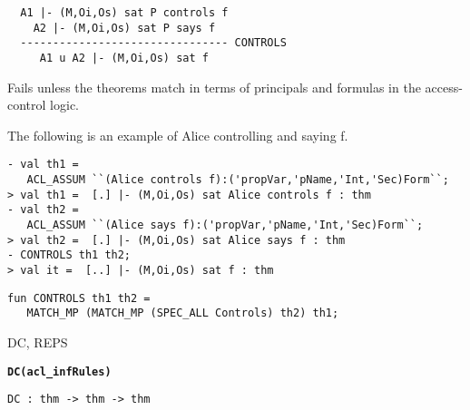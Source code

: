 \DESCRIBE
\begin{verbatim}
  A1 |- (M,Oi,Os) sat P controls f   
    A2 |- (M,Oi,Os) sat P says f
  -------------------------------- CONTROLS
     A1 u A2 |- (M,Oi,Os) sat f
\end{verbatim}

\FAILURE
Fails unless the theorems match in terms of principals and formulas
in the access-control logic.

\EXAMPLE
The following is an example of Alice controlling and saying f.
\begin{holboxed}
\begin{verbatim}
- val th1 = 
   ACL_ASSUM ``(Alice controls f):('propVar,'pName,'Int,'Sec)Form``;
> val th1 =  [.] |- (M,Oi,Os) sat Alice controls f : thm
- val th2 = 
   ACL_ASSUM ``(Alice says f):('propVar,'pName,'Int,'Sec)Form``;
> val th2 =  [.] |- (M,Oi,Os) sat Alice says f : thm
- CONTROLS th1 th2;
> val it =  [..] |- (M,Oi,Os) sat f : thm
\end{verbatim}
\end{holboxed}

\IMPLEMENTATION
\begin{holboxed}
\begin{verbatim}
fun CONTROLS th1 th2 = 
   MATCH_MP (MATCH_MP (SPEC_ALL Controls) th2) th1;
\end{verbatim}
\end{holboxed}

\SEEALSO
DC, REPS
\ENDDOC

\begin{holboxed}
  \begin{Large}
    \textbf{\texttt{DC}}\hfill{}\textbf{\texttt{(acl\_infRules)}}
  \end{Large}
\end{holboxed}

\begin{verbatim}
DC : thm -> thm -> thm
\end{verbatim}

